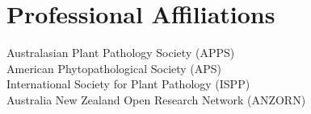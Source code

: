 
\section*{Professional Affiliations}
  Australasian Plant Pathology Society (APPS)\\[3 mm]
  American Phytopathological Society (APS)\\[3 mm]
  International Society for Plant Pathology (ISPP)\\[3 mm]
  Australia New Zealand Open Research Network (ANZORN)\\

